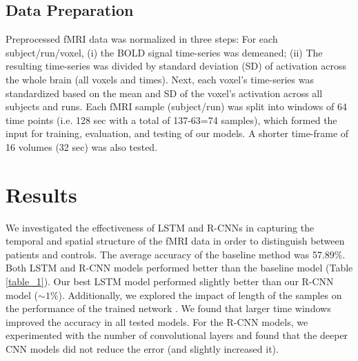 \documentclass{article}
\begin{document}
\subsection{Data Preparation}

Preprocessed fMRI data was normalized in three steps: For each subject/run/voxel, (i) the BOLD signal time-series was demeaned; (ii) The resulting time-series was divided by standard deviation (SD) of activation across the whole brain (all voxels and times). Next, each voxel's time-series was standardized based on the mean and SD of the voxel's activation across all subjects and runs.
Each fMRI sample (subject/run) was split into windows of 64 time points (i.e. 128 sec with a total of 137-63=74 samples), which formed the input for training, evaluation, and testing of our models. A shorter time-frame of 16 volumes (32 sec) was also tested.

\section{Results}

We investigated the effectiveness of LSTM and R-CNNs in capturing the temporal and spatial structure of the fMRI data in order to distinguish between patients and controls. The average accuracy of the baseline method was 57.89\%. 
Both LSTM and R-CNN models performed better than the baseline model (Table \ref{table_1}). Our best LSTM model performed slightly better than our R-CNN model ($ \sim 1\%$). Additionally, we explored the impact of length of the samples on the performance of the trained network . We found that larger time windows improved the accuracy in all tested models. For the R-CNN models, we experimented with the number of convolutional layers and found that the deeper CNN models did not reduce the error (and slightly increased it).

\end{document}
